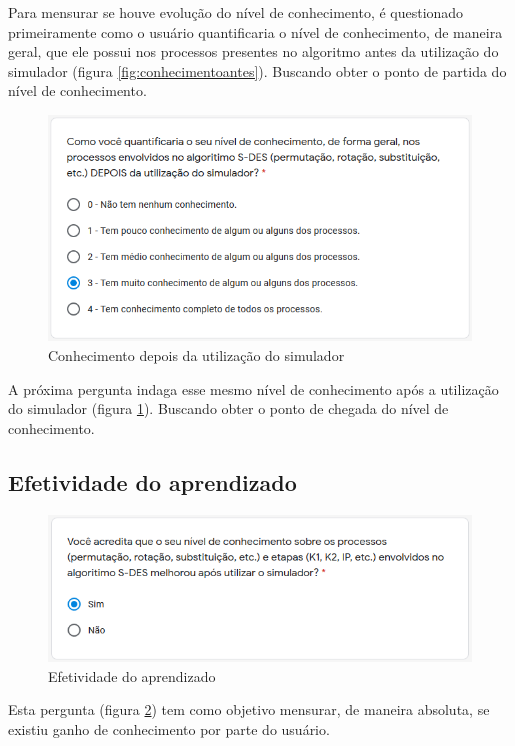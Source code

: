 Para mensurar se houve evolução do nível de conhecimento, é questionado primeiramente como o usuário quantificaria o nível de conhecimento, de maneira geral, que ele possui nos processos presentes no algoritmo antes da utilização do simulador (figura \ref{fig:conhecimentoantes}). Buscando obter o ponto de partida do nível de conhecimento.

\begin{figure}[H]
    \centering
    \caption{Conhecimento depois da utilização do simulador}
    \label{fig:conhecimentodepois}
    \includegraphics[width=0.75\linewidth]{Questionario/Q3.png}
\end{figure}

A próxima pergunta indaga esse mesmo nível de conhecimento após a utilização do simulador (figura \ref{fig:conhecimentodepois}). Buscando obter o ponto de chegada do nível de conhecimento.

\subsection{Efetividade do aprendizado}

\begin{figure}[H]
    \centering
    \caption{Efetividade do aprendizado}
    \label{fig:efetividadeaprendizado}
    \includegraphics[width=0.75\linewidth]{Questionario/Q4.png}
\end{figure}

Esta pergunta (figura \ref{fig:efetividadeaprendizado}) tem como objetivo mensurar, de maneira absoluta, se existiu ganho de conhecimento por parte do usuário.

